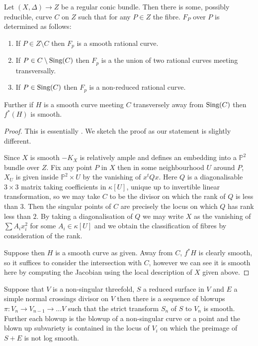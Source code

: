 	\begin{lemma}
	Let $(X,\Delta) \to Z$ be a regular conic bundle. Then there is some, possibly reducible, curve $C$ on $Z$ such that for any $P \in Z$ the fibre. $F_{P}$ over $P$ is determined as follows:
	\begin{enumerate}
		\item If $P \in Z\setminus C$ then $F_{p}$ is a smooth rational curve.
		\item If $P \in C\setminus \text{Sing}(C)$ then $F_{p}$ is a the union of two rational curves meeting transversally.
		\item If $P \in \text{Sing}(C)$ then $F_{p}$ is a non-reduced rational curve.
	\end{enumerate}
	Further if $H$ is a smooth curve meeting $C$ transversely away from $\text{Sing}(C)$ then $f^{*}(H)$ is smooth.
\end{lemma}
\begin{proof}
	This is essentially \cite[Proposition 1.8]{sarkisov1983conic}. We sketch the proof as our statement is slightly different.
	
	Since $X$ is smooth $-K_{X}$ is relatively ample and defines an embedding into a $\mathbb{P}^{2}$ bundle over $Z$.
	Fix any point $P$ in $X$ then in some neighbourhood $U$ around $P$, $X_{U}$ is given inside $\mathbb{P}^{2} \times U$ by the vanishing of $x^{t}Qx$. Here $Q$ is a diagonalisable $3\times 3$ matrix taking coefficients in $\kappa[U]$, unique up to invertible linear transformation, so we may take $C$ to be the divisor on which the rank of $Q$ is less than $3$. Then the singular points of $C$ are precisely the locus on which $Q$ has rank less than $2$. By taking a diagonalisation of $Q$ we may write $X$ as the vanishing of $\sum A_{i}x_{i}^{2}$ for some $A_{i} \in \kappa[U]$ and we obtain the classification of fibres by consideration of the rank.
	
	Suppose then $H$ is a smooth curve as given. Away from $C$, $f^{*}H$ is clearly smooth, so it suffices to consider the intersection with $C$, however we can see it is smooth here by computing the Jacobian using the local description of $X$ given above. 
\end{proof}


	\begin{theorem}\cite[Theorem 1.2]{cutkosky2009resolution}
	Suppose that $V$ is a non-singular threefold, $S$ a reduced surface in $V$ and $E$ a simple normal crossings divisor on $V$ then there is a sequence of blowups $\pi\colon V_{n} \to V_{n-1} \to ... V$ such that the strict transform $S_{n}$ of $S$ to $V_{n}$ is smooth. Further each blowup is the blowup of a non-singular curve or a point and the blown up subvariety is contained in the locus of $V_{i}$ on which the preimage of $S+E$ is not log smooth.
\end{theorem}

